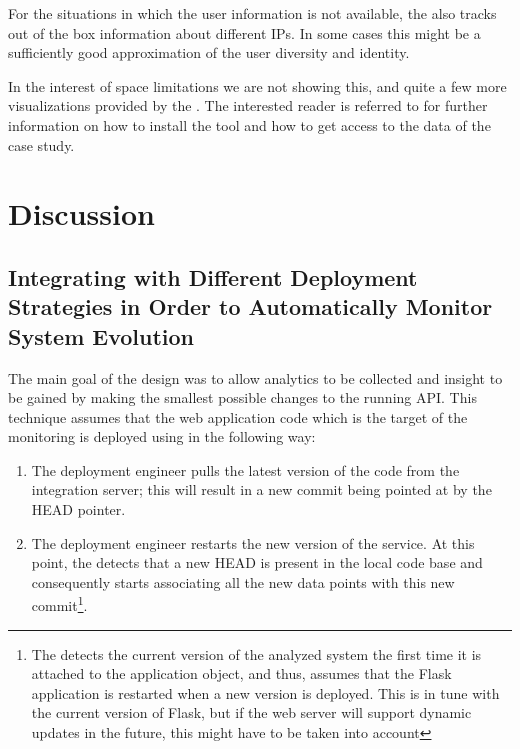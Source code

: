 \documentclass[conference]{IEEEtran}
\begin{document}
  For the situations in which the user information is not available, the \tool also tracks out of the box information about different IPs. In some cases this might be a sufficiently good approximation of the user diversity and identity. 
  
  In the interest of space limitations we are not showing this, and quite a few more visualizations provided by the \tool. The interested reader is referred to  for further information on how to install the tool and how to get access to the data of the case study.

\section{Discussion}

  \subsection{Integrating with Different Deployment Strategies in Order to Automatically Monitor System Evolution}

  The main goal of the \tool design was to allow analytics to be collected and insight to be gained by making the smallest possible changes to the running API. %
%
  This technique assumes that the web application code which is the target of the monitoring is deployed using \git in the following way: 

  \begin{enumerate}
    \item The deployment engineer pulls the latest version of the code from the integration server; this will result in a new commit being pointed at by the HEAD pointer. %
    \item The deployment engineer restarts the new version of the service. At this point, the \tool detects that a new HEAD is present in the local code base and consequently starts associating all the new data points with this new commit\footnote{The \tool detects the current version of the analyzed system the first time it is attached to the application object, and thus, assumes that the Flask application is restarted when a new version is deployed. This is in tune with the current version of Flask, but if the web server will support dynamic updates in the future, this might have to be taken into account}.
  \end{enumerate}
\end{document}
